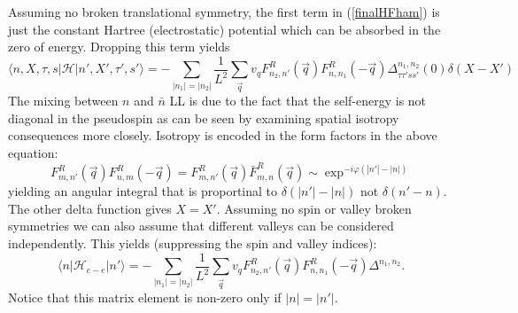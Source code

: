 \documentclass{ws-ijmpb}
\begin{document}
Assuming no broken translational symmetry, the
first term in (\ref{finalHFham}) is just the constant Hartree (electrostatic) potential
which can be absorbed in the zero of energy.  Dropping this term yields
\begin{equation}
\langle n,X,\tau,s | \mathcal{H} |n',X',\tau',s' \rangle = - \sum_{|n_{1}| = 
|n_{2}|}
\frac{1}{L^{2}}  \sum_{\vec{q}} v_{q}
F^{R}_{n_{2},n'}(\vec{q})F^{R}_{n,n_{1}}(-\vec{q}) \Delta^{n_{1},n_{2}}_{\tau \tau' s
s'}(0) \delta(X-X')
\end{equation}
The mixing between $n$ and $\bar{n}$ LL is due to the fact that the self-energy 
is not diagonal in the pseudospin as can be seen by examining spatial isotropy 
consequences more closely.  Isotropy is encoded in the form 
factors in the above equation: 
\begin{equation}
F^{R}_{m,n'}(\vec{q})F^{R}_{n,m}(-\vec{q}) =
F^{R}_{m,n'}(\vec{q}) \bar{F}^{R}_{m,n}(\vec{q}) \sim  \exp^{-i \varphi (|n'|-|n|)}
\end{equation}
yielding an angular integral that is proportinal to $\delta(|n'| - |n|) $ not $\delta 
(n'-n)$. The other delta function gives $X=X'$.  Assuming no spin or valley broken 
symmetries we can also assume that 
different valleys can be considered independently.  This yields (suppressing 
the spin and valley indices):
\begin{equation}
\label{finaleeham}
\langle n |\mathcal{H}_{e-e}| n' \rangle = -\sum_{|n_{1}| = |n_{2}|}
\frac{1}{L^{2}}  \sum_{\vec{q}} v_{q}
F^{R}_{n_{2},n'}(\vec{q})F^{R}_{n,n_{1}}(-\vec{q}) \Delta^{n_{1},n_{2}}.
\end{equation}
Notice that this matrix element is non-zero only if $|n|=|n'|$.
\end{document}
